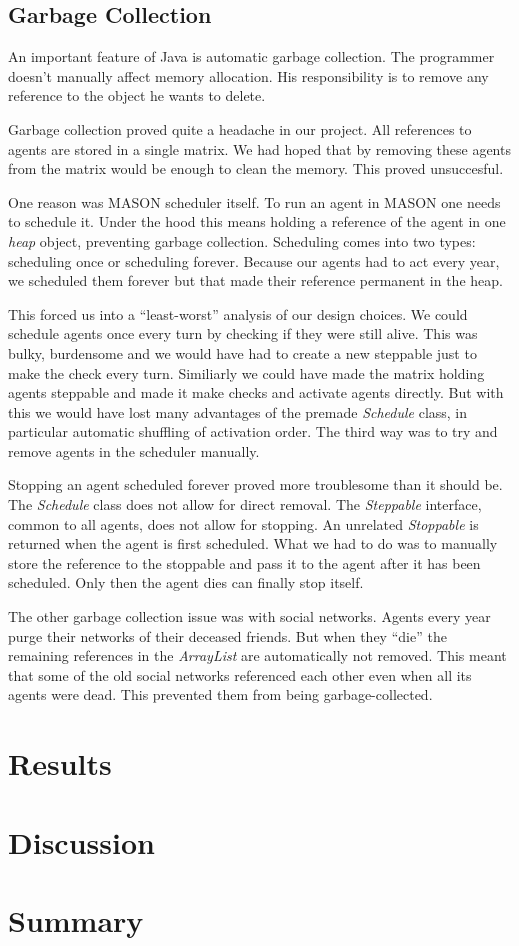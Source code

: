 \documentclass[runningheads,a4paper]{llncs}
\begin{document}
\subsection{Garbage Collection}

An important feature of Java is automatic garbage collection.
The programmer doesn't manually affect memory allocation. 
His responsibility is to remove any reference to the object he wants to delete.

Garbage collection proved quite a headache in our project.
All references to agents are stored in a single matrix.
We had hoped that by removing these agents from the matrix would be enough to clean the memory.
This proved unsuccesful.

One reason was MASON scheduler itself.
To run an agent in MASON one needs to schedule it.
Under the hood this means holding a reference of the agent in one \textit{heap} object, preventing garbage collection.
Scheduling comes into two types: scheduling once or scheduling forever.
Because our agents had to act every year, we scheduled them forever but that made their reference permanent in the heap.

This forced us into a ``least-worst'' analysis of our design choices.
We could schedule agents once every turn by checking if they were still alive.
This was bulky, burdensome and we would have had to create a new steppable just to make the check every turn.
Similiarly we could have made the matrix holding agents steppable and made it make checks and activate agents directly.
But with this we would have lost many advantages of the premade \textit{Schedule} class, in particular automatic shuffling of activation order.
The third way was to try and remove agents in the scheduler manually.

Stopping an agent scheduled forever proved more troublesome than it should be.
The \textit{Schedule} class does not allow for direct removal. 
The \textit{Steppable} interface, common to all agents, does not allow for stopping.
An unrelated \textit{Stoppable} is returned when the agent is first scheduled.
What we had to do was to manually store the reference to the stoppable and pass it to the agent after it has been scheduled.
Only then the agent dies can finally stop itself.

The other garbage collection issue was with social networks.
Agents every year purge their networks of their deceased friends. 
But when they ``die'' the remaining references in the \textit{ArrayList} are automatically not removed.
This meant that some of the old social networks referenced each other even when all its agents were dead.
This prevented them from being garbage-collected.




\section{Results}


\section{Discussion}
\section{Summary}



\end{document}
